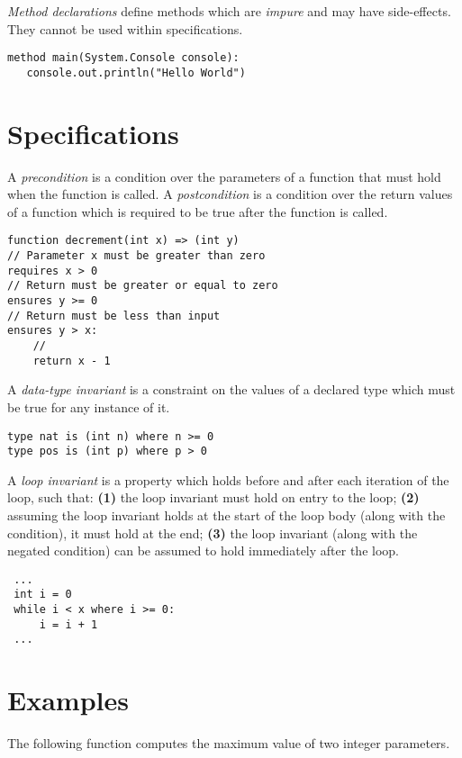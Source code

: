 \documentclass[a4paper,10pt,twcolumn]{article}
\begin{document}
{\em Method declarations} define methods which are {\em impure} and
may have side-effects.  They cannot be used within specifications.

\begin{lstlisting}
method main(System.Console console):
   console.out.println("Hello World")
\end{lstlisting}

\section*{Specifications}

A {\em precondition} is a condition over the parameters of a function
that must hold when the function is called.  A {\em
  postcondition} is a condition over the return values of a function
which is required to be true after the function is called.

\begin{lstlisting}
function decrement(int x) => (int y) 
// Parameter x must be greater than zero
requires x > 0
// Return must be greater or equal to zero
ensures y >= 0
// Return must be less than input
ensures y > x:
    //
    return x - 1
\end{lstlisting}

A {\em data-type invariant} is a constraint on the values of a
declared type which must be true for any instance of it.

\begin{lstlisting}
type nat is (int n) where n >= 0
type pos is (int p) where p > 0
\end{lstlisting}

A {\em loop invariant} is a property which holds before and after each
iteration of the loop, such that: {\bf (1)} the loop invariant must hold on
entry to the loop; {\bf (2)} assuming the loop invariant holds at the start of
the loop body (along with the condition), it must hold at the end; {\bf (3)}
the loop invariant (along with the negated condition) can be assumed
to hold immediately after the loop.
\newline
\begin{lstlisting}
 ...
 int i = 0
 while i < x where i >= 0:
     i = i + 1 
 ...
\end{lstlisting}


\section*{Examples}

The following function computes the maximum value of two integer parameters.
\end{document}
